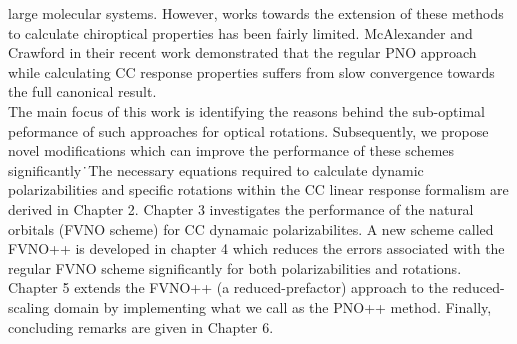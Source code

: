 large molecular systems. However, works towards the extension of these methods to calculate chiroptical properties has been 
fairly limited\cite{Gauss00,Korona04,Russ04,McAlexander12,Friedrich15,Russ08}. McAlexander and Crawford in their recent 
work\cite{McAlexander15:LRCC} demonstrated that the regular PNO approach while calculating CC response properties 
suffers from slow convergence towards the full canonical result. \\
The main focus of this work is identifying the 
reasons behind the sub-optimal peformance of such approaches for optical rotations. Subsequently, we propose novel modifications
which can improve the performance of these schemes significantly\.\
The necessary equations required to calculate dynamic polarizabilities and specific rotations within the CC linear response formalism are derived in Chapter 2. %
Chapter 3 investigates the performance of the natural orbitals (FVNO scheme) for CC dynamaic polarizabilites.
A new scheme called FVNO++ is developed in chapter 4 which reduces the errors associated with the regular FVNO scheme
significantly for both polarizabilities and rotations. Chapter 5 extends the FVNO++ (a reduced-prefactor) approach to the reduced-scaling 
domain by implementing what we call as the PNO++ method. Finally, concluding remarks are given in Chapter 6.

